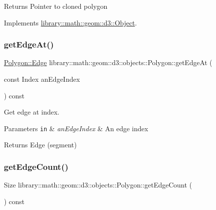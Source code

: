 \begin{DoxyReturn}{Returns}
Pointer to cloned polygon 
\end{DoxyReturn}


Implements \hyperlink{classlibrary_1_1math_1_1geom_1_1d3_1_1_object_a1a784c6b359e0eb97cd34fabc42f2f3f}{library\+::math\+::geom\+::d3\+::\+Object}.

\mbox{\label{classlibrary_1_1math_1_1geom_1_1d3_1_1objects_1_1_polygon_aa595f3aa1b457b453745692ccee8a808}} 
\subsubsection{\texorpdfstring{get\+Edge\+At()}{getEdgeAt()}}
{\footnotesize\ttfamily \hyperlink{classlibrary_1_1math_1_1geom_1_1d3_1_1objects_1_1_polygon_a7962e0559e972fe43eef942ce318fb8d}{Polygon\+::\+Edge} library\+::math\+::geom\+::d3\+::objects\+::\+Polygon\+::get\+Edge\+At (\begin{DoxyParamCaption}\item[{const Index}]{an\+Edge\+Index }\end{DoxyParamCaption}) const}



Get edge at index. 


\begin{DoxyParams}[1]{Parameters}
\mbox{\tt in}  & {\em an\+Edge\+Index} & An edge index \\
\hline
\end{DoxyParams}
\begin{DoxyReturn}{Returns}
Edge (segment) 
\end{DoxyReturn}
\mbox{\label{classlibrary_1_1math_1_1geom_1_1d3_1_1objects_1_1_polygon_aa9ff0300eec7d810c55c2782fcc46cf6}} 
\subsubsection{\texorpdfstring{get\+Edge\+Count()}{getEdgeCount()}}
{\footnotesize\ttfamily Size library\+::math\+::geom\+::d3\+::objects\+::\+Polygon\+::get\+Edge\+Count (\begin{DoxyParamCaption}{ }\end{DoxyParamCaption}) const}



